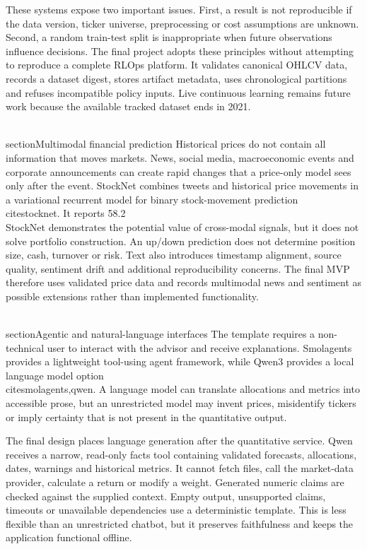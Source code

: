 These systems expose two important issues. First, a result is not reproducible if the data version, ticker universe, preprocessing or cost assumptions are unknown. Second, a random train-test split is inappropriate when future observations influence decisions. The final project adopts these principles without attempting to reproduce a complete RLOps platform. It validates canonical OHLCV data, records a dataset digest, stores artifact metadata, uses chronological partitions and refuses incompatible policy inputs. Live continuous learning remains future work because the available tracked dataset ends in 2021.

\\section{Multimodal financial prediction}
Historical prices do not contain all information that moves markets. News, social media, macroeconomic events and corporate announcements can create rapid changes that a price-only model sees only after the event. StockNet combines tweets and historical price movements in a variational recurrent model for binary stock-movement prediction \\cite{stocknet}. It reports 58.2\\%

StockNet demonstrates the potential value of cross-modal signals, but it does not solve portfolio construction. An up/down prediction does not determine position size, cash, turnover or risk. Text also introduces timestamp alignment, source quality, sentiment drift and additional reproducibility concerns. The final MVP therefore uses validated price data and records multimodal news and sentiment as possible extensions rather than implemented functionality.

\\section{Agentic and natural-language interfaces}
The template requires a non-technical user to interact with the advisor and receive explanations. Smolagents provides a lightweight tool-using agent framework, while Qwen3 provides a local language model option \\cite{smolagents,qwen}. A language model can translate allocations and metrics into accessible prose, but an unrestricted model may invent prices, misidentify tickers or imply certainty that is not present in the quantitative output.

The final design places language generation after the quantitative service. Qwen receives a narrow, read-only facts tool containing validated forecasts, allocations, dates, warnings and historical metrics. It cannot fetch files, call the market-data provider, calculate a return or modify a weight. Generated numeric claims are checked against the supplied context. Empty output, unsupported claims, timeouts or unavailable dependencies use a deterministic template. This is less flexible than an unrestricted chatbot, but it preserves faithfulness and keeps the application functional offline.

